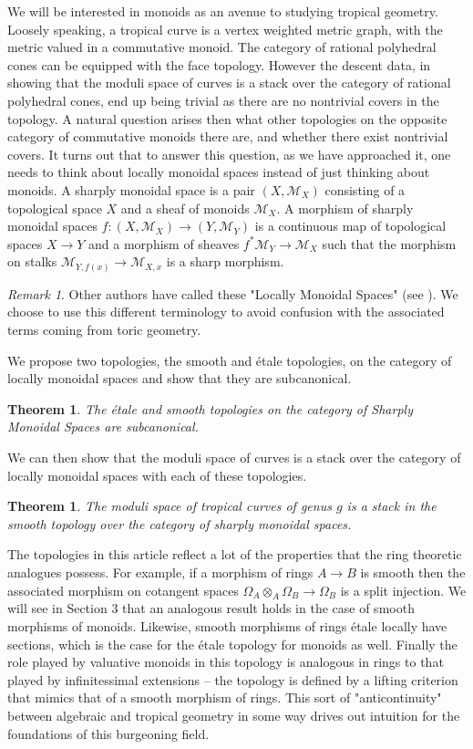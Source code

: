 \documentclass[12pt]{amsart}
\numberwithin{equation}{section}
\theoremstyle{plain}
\newtheorem{thm}[equation]{Theorem}
\theoremstyle{remark}
\newtheorem{rmk}[equation]{Remark}
\newcommand{\calM}{\mathcal{M}}
\begin{document}
	We will be interested in monoids as an avenue to studying tropical geometry. Loosely speaking, a tropical curve is a vertex weighted metric graph, with the metric valued in a commutative monoid. The category of rational polyhedral cones can be equipped with the face topology. However the descent data, in showing that the moduli space of curves is a stack over the category of rational polyhedral cones, end up being trivial as there are no nontrivial covers in the topology. A natural question arises then what other topologies on the opposite category of commutative monoids there are, and whether there exist nontrivial covers. It turns out that to answer this question, as we have approached it, one needs to think about locally monoidal spaces instead of just thinking about monoids. A sharply monoidal space is a pair $(X, \calM_X)$ consisting of a topological space $X$ and a sheaf of monoids $\calM_X$. A morphism of sharply monoidal spaces $f:(X,\calM_X)\to (Y,\calM_Y)$ is a continuous map of topological spaces $X\to Y$ and a morphism of sheaves $f^*\calM_Y\to \calM_X$ such that the morphism on stalks $\calM_{Y,f(x)}\to \calM_{X,x}$ is a sharp morphism.
\begin{rmk}
	Other authors have called these "Locally Monoidal Spaces" (see \cite{Fans}). We choose to use this different terminology to avoid confusion with the associated terms coming from toric geometry.
\end{rmk}
We propose two topologies, the smooth and \'etale topologies, on the category of locally monoidal spaces and show that they are subcanonical.
\begin{thm}
	The \'etale and smooth topologies on the category of Sharply Monoidal Spaces are subcanonical. 
\end{thm}
We can then show that the moduli space of curves is a stack over the category of locally monoidal spaces with each of these topologies. \\
\begin{thm}
	The moduli space of tropical curves of genus $g$ is a stack in the smooth topology over the category of sharply monoidal spaces.
\end{thm}
The topologies in this article reflect a lot of the properties that the ring theoretic analogues possess. For example, if a morphism of rings $A\to B$ is smooth then the associated morphism on cotangent spaces $\Omega_A\otimes_A \Omega_B\to \Omega_B$ is a split injection. We will see in Section 3 that an analogous result holds in the case of smooth morphisms of monoids. Likewise, smooth morphisms of rings \'etale locally have sections, which is the case for the \'etale topology for monoids as well. Finally the role played by valuative monoids in this topology is analogous in rings to that played by infinitessimal extensions -- the topology is defined by a lifting criterion that mimics that of a smooth morphism of rings. This sort of "anticontinuity" between algebraic and tropical geometry in some way drives out intuition for the foundations of this burgeoning field.\\
\end{document}
